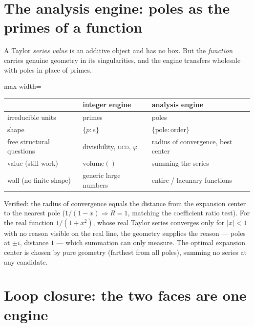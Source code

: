 \documentclass[11pt]{article}
\begin{document}
\section{The analysis engine: poles as the primes of a function}

A Taylor \emph{series value} is an additive object and has no box. But the \emph{function} carries genuine
geometry in its singularities, and the engine transfers wholesale with poles in place of primes.

\begin{center}
\begin{adjustbox}{max width=\linewidth}\begin{tabular}{lll}
\toprule
 & integer engine & analysis engine \\
\midrule
irreducible units & primes & poles \\
shape & $\{p:e\}$ & $\{\text{pole}:\text{order}\}$ \\
free structural questions & divisibility, \textsc{gcd}, $\varphi$ & radius of convergence, best center \\
value (still work) & $\mathrm{volume}()$ & summing the series \\
wall (no finite shape) & generic large numbers & entire / lacunary functions \\
\bottomrule
\end{tabular}\end{adjustbox}
\end{center}

Verified: the radius of convergence equals the distance from the expansion center to the nearest pole
($1/(1-x)\Rightarrow R=1$, matching the coefficient ratio test). For the real function $1/(1+x^2)$, whose
real Taylor series converges only for $|x|<1$ with no reason visible on the real line, the geometry supplies
the reason --- poles at $\pm i$, distance $1$ --- which summation can only measure. The optimal expansion
center is chosen by pure geometry (farthest from all poles), summing no series at any candidate.

\section{Loop closure: the two faces are one engine}
\end{document}
